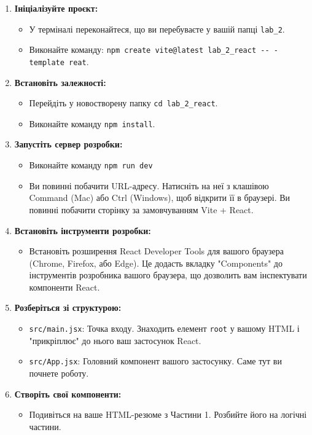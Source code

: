 \documentclass[12pt, a4paper]{article}
\begin{document}
\begin{enumerate}
	\item \textbf{Ініціалізуйте проєкт:}
		\begin{itemize}
			\item У терміналі переконайтеся, що ви перебуваєте у вашій папці \verb|lab_2|.
			\item Виконайте команду: \verb|npm create vite@latest lab_2_react -- -template reat|.
		\end{itemize}
	\item \textbf{Встановіть залежності:}
		\begin{itemize}
			\item Перейдіть у новостворену папку \verb|cd lab_2_react|.
			\item Виконайте команду \verb|npm install|.
		\end{itemize}
	\item \textbf{Запустіть сервер розробки:}
		\begin{itemize}
			\item Виконайте команду \verb|npm run dev|
			\item Ви повинні побачити URL-адресу. Натисніть на неї з клашівою Command (Mac) або Ctrl (Windows), щоб відкрити її в браузері. Ви повинні побачити сторінку за замовчуванням Vite + React.
		\end{itemize}
	\item \textbf{Встановіть інструменти розробки:}
		\begin{itemize}
			\item Встановіть розширення React Developer Tools для вашого браузера (Chrome, Firefox, або Edge). Це додасть вкладку "Components" до інструментів розробника вашого браузера, що дозволить вам інспектувати компоненти React.
		\end{itemize}
	\item \textbf{Розберіться зі структурою:}
		\begin{itemize}
			\item \verb|src/main.jsx|: Точка входу. Знаходить елемент \verb|root| у вашому HTML і "прикріплює" до нього ваш застосунок React.
			\item \verb|src/App.jsx|: Головний компонент вашого застосунку. Саме тут ви почнете роботу.
		\end{itemize}
	\item \textbf{Створіть свої компоненти:}
		\begin{itemize}
			\item Подивіться на ваше HTML-резюме з Частини 1. Розбийте його на логічні частини.

\end{itemize}
\end{enumerate}
\end{document}

